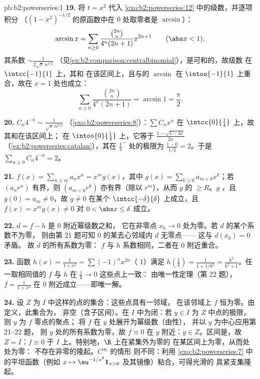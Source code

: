 \begin{solution}{pb:b2:powerseries:1}
\textbf{19.} 将 $t = x^2$ 代入
\cref{exo:b2:powerseries:12} 中的级数，并逐项积分
（$(1-x^2)^{-1/2}$ 的原函数中在 $0$ 处取零者是
$\arcsin$）：
\[
\arcsin x = \sum_{n\geq0}
\frac{\binom{2n}n}{4^n(2n+1)}x^{2n+1}
\qquad(\abs x < 1) .
\]
其系数 $\sim \frac{1}{2\sqrt\pi\,n^{3/2}}$
（见\cref{ex:b2:comparison:centralbinomial}），是可和的，故级数
在 $\intcc{-1}{1}$ 上\emph{}，其和
在该区间上，且与的 $\arcsin$
在 $\intoo{-1}{1}$ 上重合，故在 $x = 1$ 处也成立：
\[
\sum_{n\geq0}\frac{\binom{2n}n}{4^n(2n+1)}
= \arcsin 1 = \frac\pi2 .
\]

\textbf{20.} $C_n4^{-n} \sim \frac{1}{\sqrt\pi\,n^{3/2}}$
（\cref{exo:b2:powerseries:8}）：$\sum
C_nx^n$ 在 $\intcc{0}{\frac14}$ 上，故其和在该区间上；
在 $\intoo{0}{\frac14}$ 上，它等于
$\frac{1-\sqrt{1-4x}}{2x}$
（\cref{ex:b2:powerseries:catalan}），其在 $\frac14^-$ 处的极限为
$\frac{1-0}{1/2} = 2$。于是 $\sum_{n\geq0}
C_n4^{-n} = 2$。

\textbf{21.} $f(x) = \sum_{n\geq m}a_nx^n = x^m g(x)$，其中
$g(x) = \sum_{k\geq0}a_{m+k}x^k$；若 $(a_nr^n)$ 有界，则
$(a_{m+k}r^k)$ 亦有界（除以 $r^m$），从而 $g$ 的 $\geq
R$。$g$ ，且 $g(0) = a_m \neq 0$，故 $g \neq 0$
在某个 $\intcc{-\delta}{\delta}$ 上成立，且 $f(x) = x^mg(x) \neq 0$
对 $0 < \abs x \leq \delta$ 成立。

\textbf{22.} $d = f - h$ 是 $0$ 附近幂级数之和，
它在非零点 $x_k \to 0$ 处为零。若 $d$ 的某个系数不为零，
则由第 21 题可知 $0$ 的某去心邻域内 $d$ 无零点——
这与 $d(x_k) = 0$ 矛盾。
故 $d$ 的所有系数为零：
$f$ 与 $h$ 系数相同，二者在 $0$ 附近重合。

\textbf{23.} 函数 $h(x) = \frac{1}{1+x^2} =
\sum(-1)^nx^{2n}$（ $1$）满足 $h(\frac1k) =
\frac{1}{1 + 1/k^2} = \frac{k^2}{k^2+1}$。任一取相同值的 $f$
与 $h$ 在 $\frac1k \to 0$ 这些点上一致：
由唯一性定理（第 22 题），$f = \frac{1}{1+x^2}$
在 $0$ 附近成立——即唯一解。

\textbf{24.} 设 $Z$ 为 $I$ 中这样的点的集合：这些点具有一邻域，
在该邻域上 $f$ 恒为零。由定义，此集合为，
非空（含子区间）。在 $I$ 中为闭：若 $y
\in I$ 为 $Z$ 中点的极限，则 $y$ 为 $f$ 零点的聚点；
将 $f$ 在 $y$ 处展开为幂级数（由性），
并以 $y$ 为中心应用第 21--22 题，
则 $y$ 处的所有系数为零，故 $f \equiv 0$ 在 $y$ 附近：$y
\in Z$。区间是，故 $Z = I$：$f \equiv 0$ 于
$I$ 上。特别地，$\R$ 上在紧集外为零的
在某区间上为零，从而处处为零：
不存在非零的隆起。$C^\infty$ 的情形
则不同：利用
\cref{exo:b2:powerseries:7} 中的平坦函数（例如 $x \mapsto
\eu^{-1/x^2}\mathbf 1_{x>0}$ 及其镜像）粘合，可得光滑的
具紧支集隆起。


\end{solution}
